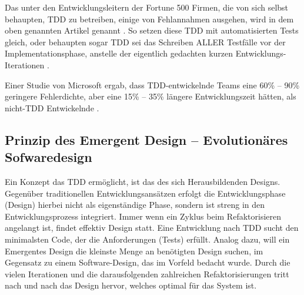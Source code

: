 Das unter den Entwicklungsleitern der Fortune 500 Firmen, die von sich selbst behaupten, TDD zu betreiben, einige von Fehlannahmen ausgehen, wird in dem oben genannten Artikel genannt \citep{janzen_does_2008}. So setzen diese TDD mit automatisierten Tests gleich, oder behaupten sogar TDD sei das Schreiben ALLER Testfälle vor der Implementationsphase, anstelle der eigentlich gedachten kurzen Entwicklungs-Iterationen \citep{janzen_does_2008}.

Einer Studie von Microsoft ergab, dass TDD-entwickelnde Teams eine 60\% -- 90\% geringere Fehlerdichte, aber eine 15\% -- 35\% längere Entwicklungszeit hätten, als nicht-TDD Entwickelnde \citep{nagappan_realizing_2008}.





  



\subsection{Prinzip des Emergent Design -- Evolutionäres Sofwaredesign}
Ein Konzept das TDD ermöglicht, ist das des sich Herausbildenden Designs. Gegenüber traditionellen Entwicklungsansätzen erfolgt die Entwicklungsphase (Design) hierbei nicht als eigenständige Phase, sondern ist streng in den Entwicklungsprozess integriert. Immer wenn ein Zyklus beim Refaktorisieren angelangt ist, findet effektiv Design statt. Eine Entwicklung nach TDD sucht den minimalsten Code, der die Anforderungen (Tests) erfüllt. Analog dazu, will ein Emergentes Design die kleinste Menge an benötigten Design suchen, im Gegensatz zu einem Software-Design, das im Vorfeld bedacht wurde. Durch die vielen Iterationen und die darausfolgenden zahlreichen Refaktorisierungen tritt nach und nach das Design hervor, welches optimal für das System ist. 









